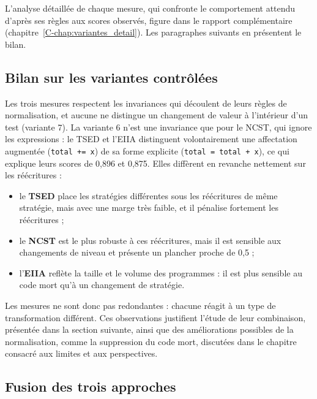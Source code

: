 \documentclass[12pt,a4paper,oneside]{report}
\begin{document}
L'analyse détaillée de chaque mesure, qui confronte le comportement attendu
d'après ses règles aux scores observés, figure dans le rapport
complémentaire (chapitre~\ref{C-chap:variantes_detail}). Les paragraphes
suivants en présentent le bilan.


\subsection{Bilan sur les variantes contrôlées}

Les trois mesures respectent les invariances qui découlent de leurs règles de
normalisation, et aucune ne distingue un changement de valeur à l'intérieur
d'un test (variante 7). La variante 6 n'est une invariance que pour le NCST,
qui ignore les expressions : le TSED et l'EIIA distinguent volontairement une
affectation augmentée (\texttt{total += x}) de sa forme explicite
(\texttt{total = total + x}), ce qui explique leurs scores de 0,896 et
0,875. Elles diffèrent en revanche nettement sur les
réécritures :
\begin{itemize}
  \item le \textcolor{tsedcol}{\textbf{TSED}} place les stratégies
        différentes sous les réécritures de même stratégie, mais avec une
        marge très faible, et il pénalise fortement les réécritures ;
  \item le \textcolor{ncstcol}{\textbf{NCST}} est le plus robuste à ces
        réécritures, mais il est sensible aux changements de niveau et
        présente un plancher proche de 0,5 ;
  \item l'\textcolor{eiiacol}{\textbf{EIIA}} reflète la taille et le volume
        des programmes : il est plus sensible au code mort qu'à un changement
        de stratégie.
\end{itemize}
Les mesures ne sont donc pas redondantes : chacune réagit à un type de
transformation différent. Ces observations justifient l'étude de leur
combinaison, présentée dans la section suivante, ainsi que des améliorations
possibles de la normalisation, comme la suppression du code mort, discutées
dans le chapitre consacré aux limites et aux perspectives.

\subsection{Fusion des trois approches}
\label{sec:fusion_variantes}
\end{document}
